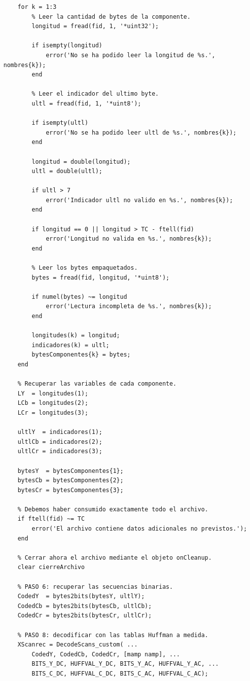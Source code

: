 \documentclass[11pt,a4paper,oneside]{report}
\begin{document}
\begin{lstlisting}
    for k = 1:3
        % Leer la cantidad de bytes de la componente.
        longitud = fread(fid, 1, '*uint32');

        if isempty(longitud)
            error('No se ha podido leer la longitud de %s.', nombres{k});
        end

        % Leer el indicador del ultimo byte.
        ultl = fread(fid, 1, '*uint8');

        if isempty(ultl)
            error('No se ha podido leer ultl de %s.', nombres{k});
        end

        longitud = double(longitud);
        ultl = double(ultl);

        if ultl > 7
            error('Indicador ultl no valido en %s.', nombres{k});
        end

        if longitud == 0 || longitud > TC - ftell(fid)
            error('Longitud no valida en %s.', nombres{k});
        end

        % Leer los bytes empaquetados.
        bytes = fread(fid, longitud, '*uint8');

        if numel(bytes) ~= longitud
            error('Lectura incompleta de %s.', nombres{k});
        end

        longitudes(k) = longitud;
        indicadores(k) = ultl;
        bytesComponentes{k} = bytes;
    end

    % Recuperar las variables de cada componente.
    LY  = longitudes(1);
    LCb = longitudes(2);
    LCr = longitudes(3);

    ultlY  = indicadores(1);
    ultlCb = indicadores(2);
    ultlCr = indicadores(3);

    bytesY  = bytesComponentes{1};
    bytesCb = bytesComponentes{2};
    bytesCr = bytesComponentes{3};

    % Debemos haber consumido exactamente todo el archivo.
    if ftell(fid) ~= TC
        error('El archivo contiene datos adicionales no previstos.');
    end

    % Cerrar ahora el archivo mediante el objeto onCleanup.
    clear cierreArchivo

    % PASO 6: recuperar las secuencias binarias.
    CodedY  = bytes2bits(bytesY, ultlY);
    CodedCb = bytes2bits(bytesCb, ultlCb);
    CodedCr = bytes2bits(bytesCr, ultlCr);

    % PASO 8: decodificar con las tablas Huffman a medida.
    XScanrec = DecodeScans_custom( ...
        CodedY, CodedCb, CodedCr, [mamp namp], ...
        BITS_Y_DC, HUFFVAL_Y_DC, BITS_Y_AC, HUFFVAL_Y_AC, ...
        BITS_C_DC, HUFFVAL_C_DC, BITS_C_AC, HUFFVAL_C_AC);


\end{lstlisting}
\end{document}
